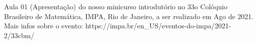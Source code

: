 Aula 01 (Apresentação) do nosso minicurso introdutório no 33o Colóquio Brasileiro de Matemática, IMPA, Rio de Janeiro, a ser realizado em Ago de 2021. Mais infos sobre o evento: https://impa.br/en_US/eventos-do-impa/2021-2/33cbm/